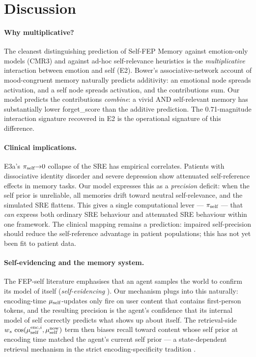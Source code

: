 \section{Discussion}
\label{sec:disc}

\paragraph{Why multiplicative?}
The cleanest distinguishing prediction of Self-FEP Memory against
emotion-only models (CMR3) and against ad-hoc self-relevance heuristics
is the \emph{multiplicative} interaction between emotion and self
(E2). Bower's associative-network account of mood-congruent memory
\cite{bower1981mood} naturally predicts additivity: an emotional node
spreads activation, and a self node spreads activation, and the
contributions sum. Our model predicts the contributions \emph{combine}:
a vivid AND self-relevant memory has substantially lower forget\_score
than the additive prediction. The 0.71-magnitude interaction signature
recovered in E2 is the operational signature of this difference.

\paragraph{Clinical implications.}
E3a's $\pi_{\text{self}}{\to}0$ collapse of the SRE has empirical correlates.
Patients with dissociative identity disorder
\cite{conway2005smemsys} and severe depression show attenuated
self-reference effects in memory tasks. Our model expresses this as a
\emph{precision} deficit: when the self prior is unreliable, all
memories drift toward neutral self-relevance, and the simulated SRE
flattens. This gives a single computational lever --- $\pi_{\text{self}}$ --- that
\emph{can} express both ordinary SRE behaviour and attenuated SRE
behaviour within one framework. The clinical mapping remains a
prediction: impaired self-precision should reduce the self-reference
advantage in patient populations; this has not yet been fit to patient
data.

\paragraph{Self-evidencing and the memory system.}
The FEP-self literature \cite{apps2014freeself,limanowski2013minimalself}
emphasises that an agent samples the world to confirm its model of
itself (\textit{self-evidencing} \cite{hohwy2016selfevidencing}). Our
mechanism plugs into this naturally: encoding-time
$\mu_{\text{self}}$-updates only fire on user content that contains first-person
tokens, and the resulting precision is the agent's confidence that its
internal model of self correctly predicts what shows up about itself.
The retrieval-side
$w_s\,\cos(\mu_{\text{self}}^{\text{enc},i}, \mu_{\text{self}}^{\text{now}})$ term then
biases recall toward content whose self prior at encoding time matched
the agent's current self prior --- a state-dependent retrieval
mechanism in the strict encoding-specificity tradition
\cite{tulving1973encodingspec}.

